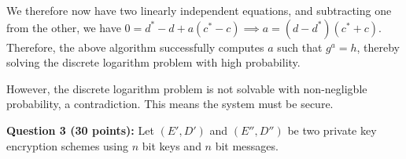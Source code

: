 \documentclass{article}
\begin{document}
\begin{mdbmarginx}{1ex}{0pt}{1ex}{0pt}
We therefore now have two linearly independent equations,
and subtracting one from the other, we have $0 = d^{*}  - d + a(c^* - c) \implies a = (d - d^*)(c^* + c) $.
Therefore,  the above algorithm successfully computes $a$ such that $g^a = h$, thereby solving 
the discrete logarithm problem with high probability.%

However, the discrete logarithm problem is not solvable with non-negligble probability, a contradiction.
This means the system must be secure.
\mdfloatright{\ensuremath{\Box}}%
\end{mdbmarginx}%

\noindent{}\textbf{Question 3 (30 points):} Let $(E',D')$ and $(E'',D'')$ be two private key encryption schemes using $n$ bit keys and $n$ bit messages.%
\end{document}

